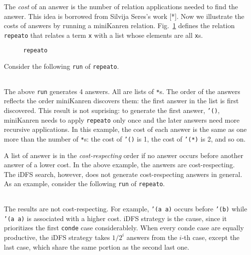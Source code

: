 \documentclass[format=acmlarge, review=true, authordraft=true]{acmart}
\begin{document}
The \emph{cost} of an answer is the number of relation applications needed to
find the answer. This idea is borrowed from Silvija Seres's work [*].
Now we illustrate the costs of answers by running a miniKanren relation.
Fig.~\ref{def-repeato} defines the relation \texttt{repeato} that 
relates a term \texttt{x} with a list whose elements are all \texttt{x}s.

\begin{figure}
  
  \caption{\texttt{repeato}}
  \label{def-repeato}
\end{figure}

Consider the following \texttt{run} of \texttt{repeato}.
\begin{center}
  \begin{tabular}{c}
  
   \end{tabular}
\end{center}

The above \texttt{run} generates 4 answers. All are lists of \texttt{*}s.
The order of the answers reflects the order miniKanren discovers them:
the first answer in the list is first discovered. This result is not suprising:
to generate the first answer, \texttt{'()}, miniKanren needs to apply
\texttt{repeato} only once and the later answers need more recursive
applications. In this example, the cost of each answer is the same as
one more than the number of \texttt{*}s: the cost of \texttt{'()} is 1,
the cost of \texttt{'(*)} is 2, and so on.

A list of answer is in the \emph{cost-respecting} order if no answer occurs
before another answer of a lower cost. In the above example, the answers are
cost-respecting. The iDFS search, however, does not generate cost-respecting
answers in general. As an example, consider the following \texttt{run} of
\texttt{repeato}.
\begin{center}
  \begin{tabular}{c}
   
   \end{tabular}
\end{center}

The results are not cost-respecting. For example, \texttt{'(a a)} occurs before
\texttt{'(b)} while \texttt{'(a a)} is associated with a higher cost. 
iDFS strategy is the cause, since it prioritizes the first \texttt{conde} case
considerablely. When every conde case are equally productive, the iDFS
strategy takes $1/2^{i}$ answers from the $i$-th case, except the last case,
which share the same portion as the second last one.
\end{document}

